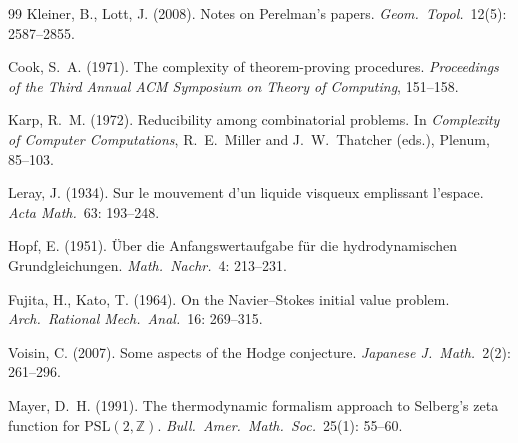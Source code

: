 \documentclass[11pt,a4paper]{article}
\theoremstyle{plain}
\theoremstyle{definition}
\begin{document}
\begin{thebibliography}{99}
Kleiner, B., Lott, J. (2008). Notes on Perelman's papers.
\emph{Geom.\ Topol.}\ 12(5): 2587--2855.

Cook, S.~A. (1971). The complexity of theorem-proving procedures.
\emph{Proceedings of the Third Annual ACM Symposium on Theory of
Computing}, 151--158.

Karp, R.~M. (1972). Reducibility among combinatorial problems.
In \emph{Complexity of Computer Computations}, R.~E.\ Miller and
J.~W.\ Thatcher (eds.), Plenum, 85--103.

Leray, J. (1934). Sur le mouvement d'un liquide visqueux
emplissant l'espace. \emph{Acta Math.}\ 63: 193--248.

Hopf, E. (1951). \"Uber die Anfangswertaufgabe f\"ur die
hydrodynamischen Grundgleichungen.
\emph{Math.\ Nachr.}\ 4: 213--231.

Fujita, H., Kato, T. (1964). On the Navier--Stokes initial value
problem. \emph{Arch.\ Rational Mech.\ Anal.}\ 16: 269--315.

Voisin, C. (2007). Some aspects of the Hodge conjecture.
\emph{Japanese J.\ Math.}\ 2(2): 261--296.

Mayer, D.~H. (1991). The thermodynamic formalism approach to
Selberg's zeta function for $\mathrm{PSL}(2, \mathbb{Z})$.
\emph{Bull.\ Amer.\ Math.\ Soc.}\ 25(1): 55--60.

\end{thebibliography}
\end{document}
